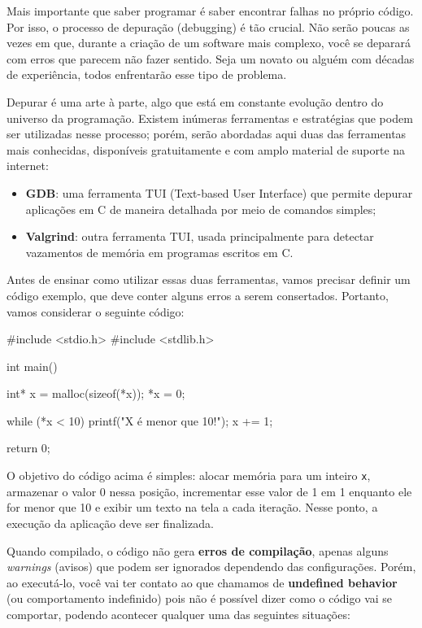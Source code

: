 Mais importante que saber programar é saber encontrar falhas no próprio código. Por isso, o processo 
de depuração (debugging) é tão crucial. Não serão poucas as vezes em que, durante a criação de um software 
mais complexo, você se deparará com erros que parecem não fazer sentido. Seja um novato ou alguém com décadas 
de experiência, todos enfrentarão esse tipo de problema.

Depurar é uma arte à parte, algo que está em constante evolução dentro do universo da programação. Existem 
inúmeras ferramentas e estratégias que podem ser utilizadas nesse processo; porém, serão abordadas aqui duas 
das ferramentas mais conhecidas, disponíveis gratuitamente e com amplo material de suporte na internet:

\begin{itemize}
    \item \textbf{GDB}: uma ferramenta TUI (Text-based User Interface) que permite depurar aplicações em C 
        de maneira detalhada por meio de comandos simples;
    \item \textbf{Valgrind}: outra ferramenta TUI, usada principalmente para detectar vazamentos de memória 
        em programas escritos em C.
\end{itemize}

Antes de ensinar como utilizar essas duas ferramentas, vamos precisar definir um código exemplo, que deve 
conter alguns erros a serem consertados. Portanto, vamos considerar o seguinte código:

\begin{excode}
    #include <stdio.h>
    #include <stdlib.h>

    int main()
    {
        int* x = malloc(sizeof(*x));
        *x = 0;

        while (*x < 10) {
            printf("X é menor que 10!\n");
            x += 1;
        }

        return 0;
    }
\end{excode}

O objetivo do código acima é simples: alocar memória para um inteiro \texttt{x}, armazenar o valor 0 
nessa posição, incrementar esse valor de 1 em 1 enquanto ele for menor que 10 e exibir um texto na tela a cada 
iteração. Nesse ponto, a execução da aplicação deve ser finalizada.

Quando compilado, o código não gera \textbf{erros de compilação}, apenas alguns \textit{warnings} 
(avisos) que podem ser ignorados dependendo das configurações. Porém, ao executá-lo, você vai ter contato 
ao que chamamos de \textbf{undefined behavior} (ou comportamento indefinido) pois não é possível dizer como o 
código vai se comportar, podendo acontecer qualquer uma das seguintes situações:

